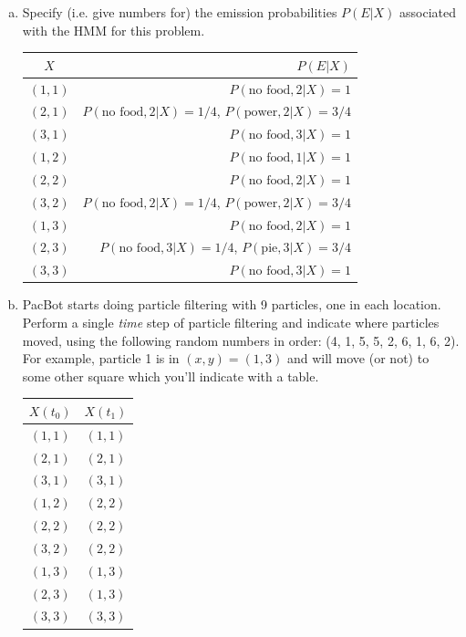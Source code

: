 \documentclass[12pt]{article}
\begin{document}
\begin{enumerate}[a)]

\item{Specify (i.e. give numbers for) the emission probabilities
  $P(E|X)$ associated with the HMM for this problem.}

\begin{table}[H]
\centering
\begin{tabular}{c r}
\hline\hline
$X$ & $P(E|X)$\\
\hline
$(1,1)$ & $P(\text{no food},2|X) = 1$\\
$(2,1)$ & $P(\text{no food},2|X) = 1/4$, $P(\text{power},2|X) = 3/4$\\
$(3,1)$ & $P(\text{no food},3|X) = 1$\\
$(1,2)$ & $P(\text{no food},1|X) = 1$\\
$(2,2)$ & $P(\text{no food},2|X) = 1$\\
$(3,2)$ & $P(\text{no food},2|X) = 1/4$, $P(\text{power},2|X) = 3/4$\\
$(1,3)$ & $P(\text{no food},2|X) = 1$\\
$(2,3)$ & $P(\text{no food},3|X) = 1/4$, $P(\text{pie},3|X) = 3/4$\\
$(3,3)$ & $P(\text{no food},3|X) = 1$\\
\hline
\end{tabular}
\end{table}

\item PacBot starts doing particle filtering with 9 particles, one in
  each location.  Perform a single \emph{time} step of particle
  filtering and indicate where particles moved, using the following
  random numbers in order: (4, 1, 5, 5, 2, 6, 1, 6, 2).  For example,
  particle 1 is in $(x,y) = (1,3)$ and will move (or not) to some
  other square which you'll indicate with a table.

\begin{table}[H]
\centering
\begin{tabular}{c c}
\hline\hline
$X(t_{0})$ & $X(t_{1})$\\
\hline
$(1,1)$ & $(1,1)$\\
$(2,1)$ & $(2,1)$\\
$(3,1)$ & $(3,1)$\\
$(1,2)$ & $(2,2)$\\
$(2,2)$ & $(2,2)$\\
$(3,2)$ & $(2,2)$\\
$(1,3)$ & $(1,3)$\\
$(2,3)$ & $(1,3)$\\
$(3,3)$ & $(3,3)$\\
\hline
\end{tabular}
\end{table}


\end{enumerate}
\end{document}
